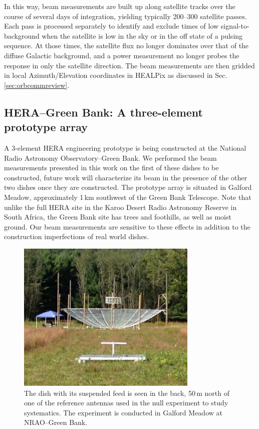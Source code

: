 \documentclass{emulateapj}
\begin{document}
In this way, beam measurements are built up along satellite tracks over the course of 
several days of integration, yielding typically 200--300 satellite passes. Each pass is 
processed separately to identify and exclude times of low signal-to-background when the 
satellite is low in the sky or in the off state of a pulsing sequence. At those times, the 
satellite flux no longer dominates over that of the diffuse Galactic background, and a 
power measurement no longer probes the response in only the satellite direction. The beam 
measurements are then gridded in local Azimuth/Elevation coordinates in HEALPix \citep{healpix} as discussed in Sec. \ref{sec:orbcommreview}.


\subsection{HERA--Green Bank: A three-element prototype array}

A 3-element HERA engineering prototype is being constructed at the National Radio 
Astronomy Observatory--Green Bank. We performed the beam measurements presented in 
this work on the first of these dishes to be constructed, future work will characterize its beam in the presence of the other two dishes once they are constructed. The prototype array is situated in Galford Meadow, approximately 1\,km southwest of the Green Bank Telescope. Note that unlike the full HERA site in the Karoo Desert Radio Astronomy Reserve in 
South Africa, the Green Bank site has trees and foothills, as well as moist ground. Our beam measurements
are sensitive to these effects in addition to the construction imperfections of real world dishes.

\begin{figure}[h]
\includegraphics[width=3.4in]{ref_dipole_and_hera_dish.pdf}
\caption{The dish with its suspended feed is seen in the back, 50\,m north of one of the reference antennas used in the null experiment to study systematics. The experiment is conducted in Galford Meadow at NRAO--Green Bank.}
\label{fig:greenbankdishphoto}
\end{figure}
\end{document}
